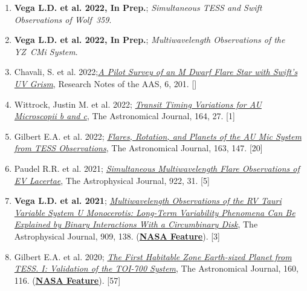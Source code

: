 \documentclass[letter,11pt]{article}
\begin{document}
\begin{enumerate}[\bfseries 1.] 

\item {\bf Vega L.D. et al. 2022, In Prep.}; {\it Simultaneous TESS and Swift Observations of Wolf~359}.

\item {\bf Vega L.D. et al. 2022, In Prep.}; {\it Multiwavelength Observations of the YZ~CMi System}.

\item {Chavali, S. et al. 2022};\href{https://ui.adsabs.harvard.edu/abs/2022RNAAS...6..201C/abstract}{\it A Pilot Survey of an M Dwarf Flare Star with Swift’s UV Grism}, Research Notes of the AAS, 6, 201. []

\item {Wittrock, Justin M. et al. 2022}; \href{https://ui.adsabs.harvard.edu/abs/2022AJ....164...27W/abstract}{\it Transit Timing Variations for AU Microscopii b and c}, The Astronomical Journal, 164, 27. [1]

\item Gilbert E.A. et al. 2022; \href{https://ui.adsabs.harvard.edu/abs/2022AJ....163..147G/abstract}{\it Flares, Rotation, and Planets of the AU Mic System from TESS Observations}, The Astronomical Journal, 163, 147. [20]

\item {Paudel R.R. et al. 2021}; 
\href{https://ui.adsabs.harvard.edu/abs/2021ApJ...922...31P/abstract}{\it Simultaneous Multiwavelength Flare Observations of EV Lacertae}, The Astrophysical Journal, 922, 31. [5]

\item {\bf Vega L.D. et al. 2021}; \href{https://ui.adsabs.harvard.edu/abs/2021ApJ...909..138V/abstract}{\it Multiwavelength Observations of the RV Tauri Variable System U Monocerotis: Long-Term Variability Phenomena Can Be Explained by Binary Interactions With a Circumbinary Disk}, The Astrophysical Journal, 909, 138. (\href{https://www.nasa.gov/feature/goddard/2021/scientists-sketch-aged-star-system-using-over-a-century-of-observations/}{\bf NASA Feature}). [3]

\item Gilbert E.A. et al. 2020; \href{https://ui.adsabs.harvard.edu/abs/2020AJ....160..116G/abstract}{\it The First Habitable Zone Earth-sized Planet from TESS. I: Validation of the TOI-700 System}, The Astronomical Journal, 160, 116.
(\href{https://www.nasa.gov/feature/goddard/2020/nasa-planet-hunter-finds-its-1st-earth-size-habitable-zone-world}{\bf NASA Feature}). [57]


\end{enumerate}
\end{document}
